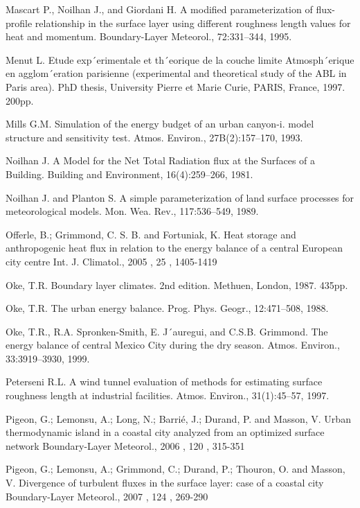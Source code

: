\begin{description}
\item
 Mascart P., Noilhan J., and Giordani H. A modified parameterization of flux-profile relationship in
the surface layer using different roughness length values for heat and momentum. Boundary-Layer
Meteorol., 72:331–344, 1995.
\item
 Menut L. Etude exp´erimentale et th´eorique de la couche limite Atmosph´erique en agglom´eration
parisienne (experimental and theoretical study of the ABL in Paris area). PhD thesis, University
Pierre et Marie Curie, PARIS, France, 1997. 200pp.
\item
 Mills G.M. Simulation of the energy budget of an urban canyon-i. model structure and sensitivity
test. Atmos. Environ., 27B(2):157–170, 1993.
\item
 Noilhan J. A Model for the Net Total Radiation flux at the Surfaces of a Building. Building and
Environment, 16(4):259–266, 1981.
\item
 Noilhan J. and Planton S. A simple parameterization of land surface processes for meteorological
models. Mon. Wea. Rev., 117:536–549, 1989.
\item
Offerle, B.; Grimmond, C. S. B. and Fortuniak, K. Heat storage and anthropogenic heat flux in relation to the energy balance of a central European city centre Int. J. Climatol., 2005 , 25 , 1405-1419 

\item
 Oke, T.R. Boundary layer climates. 2nd edition. Methuen, London, 1987. 435pp.
\item
 Oke, T.R. The urban energy balance. Prog. Phys. Geogr., 12:471–508, 1988.
\item
 Oke, T.R., R.A. Spronken-Smith, E. J´auregui, and C.S.B. Grimmond. The energy balance of central
Mexico City during the dry season. Atmos. Environ., 33:3919–3930, 1999.
\item
 Peterseni R.L. A wind tunnel evaluation of methods for estimating surface roughness length at industrial
facilities. Atmos. Environ., 31(1):45–57, 1997.
\item
Pigeon, G.; Lemonsu, A.; Long, N.; Barrié, J.; Durand, P. and Masson, V. Urban thermodynamic island in a coastal city analyzed from an optimized surface network Boundary-Layer Meteorol., 2006 , 120 , 315-351

\item
Pigeon, G.; Lemonsu, A.; Grimmond, C.; Durand, P.; Thouron, O. and Masson, V. Divergence of turbulent fluxes in the surface layer: case of a coastal city Boundary-Layer Meteorol., 2007 , 124 , 269-290


\end{description}
